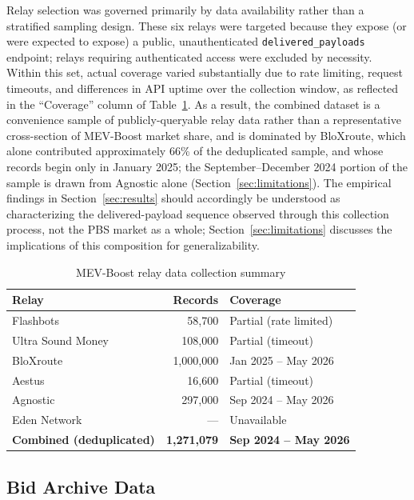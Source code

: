 \documentclass[11pt]{article}
\begin{document}
Relay selection was governed primarily by data availability rather than a
stratified sampling design. These six relays were targeted because they expose
(or were expected to expose) a public, unauthenticated \texttt{delivered\_payloads}
endpoint; relays requiring authenticated access were excluded by necessity.
Within this set, actual coverage varied substantially due to rate limiting,
request timeouts, and differences in API uptime over the collection window, as
reflected in the ``Coverage'' column of Table~\ref{tab:relays}. As a result,
the combined dataset is a convenience sample of publicly-queryable relay data
rather than a representative cross-section of MEV-Boost market share, and is
dominated by BloXroute, which alone contributed approximately 66\% of the
deduplicated sample, and whose records begin only in January 2025; the
September--December 2024 portion of the sample is drawn from Agnostic alone
(Section~\ref{sec:limitations}). The empirical findings in
Section~\ref{sec:results} should
accordingly be understood as characterizing the delivered-payload sequence
observed through this collection process, not the PBS market as a whole;
Section~\ref{sec:limitations} discusses the implications of this composition for
generalizability.

\begin{table}[!htbp]
\centering
\caption{MEV-Boost relay data collection summary}
\label{tab:relays}
\begin{tabular}{lrl}
\toprule
Relay & Records & Coverage \\
\midrule
Flashbots & 58,700 & Partial (rate limited) \\
Ultra Sound Money & 108,000 & Partial (timeout) \\
BloXroute & 1,000,000 & Jan 2025 -- May 2026 \\
Aestus & 16,600 & Partial (timeout) \\
Agnostic & 297,000 & Sep 2024 -- May 2026 \\
Eden Network & --- & Unavailable \\
\midrule
\textbf{Combined (deduplicated)} & \textbf{1,271,079} & \textbf{Sep 2024 -- May 2026} \\
\bottomrule
\end{tabular}
\end{table}

\subsection{Bid Archive Data}
\end{document}
